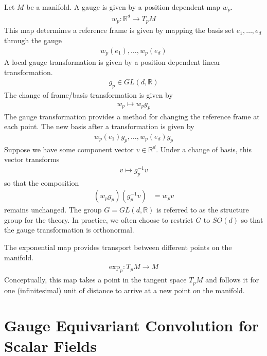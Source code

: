 \documentclass[book.tex]{subfiles}
\begin{document}
Let $M$ be a manifold. A gauge  is given by a position dependent map $w_p$.
\begin{align}
    w_p : \mathbb{R}^d \to T_p M
\end{align}
This map determines a reference frame is given by mapping the basis set $e_1,\dotsc, e_d$ through the gauge
\begin{align}
    w_p(e_1),\dotsc, w_p(e_d)
\end{align}
A local gauge transformation is given by a position dependent linear transformation.
\begin{align}
    g_p \in GL(d, \mathbb{R})
\end{align}
The change of frame/basis transformation is given by
\begin{align}
    w_p \mapsto w_p g_p
\end{align}
The gauge transformation provides a method for changing the reference frame at each point. The new basis after a transformation is given by
\begin{align}
    w_p(e_1)g_p,\dotsc, w_p(e_d)g_p
\end{align}
Suppose we have some component vector $v \in \mathbb{R}^d$. Under a change of basis, this vector transforms
\begin{align}
    v \mapsto g_p^{-1} v
\end{align}
so that the composition
\begin{align}
(w_p g_p)(g_p^{-1} v) &= w_p v
\end{align}
remains unchanged. The group $G = GL(d, \mathbb{R})$ is referred to as the structure group for the theory. In practice, we often choose to restrict $G$ to $SO(d)$ so that the gauge transformation is orthonormal.

The exponential map provides transport between different points on the manifold.
\begin{align}
    \textrm{exp}_p: T_p M \to M
\end{align}
Conceptually, this map takes a point in the tangent space $T_p M$ and follows it for one (infinitesimal) unit of distance to arrive at a new point on the manifold.

\section{Gauge Equivariant Convolution for Scalar Fields}
\end{document}

